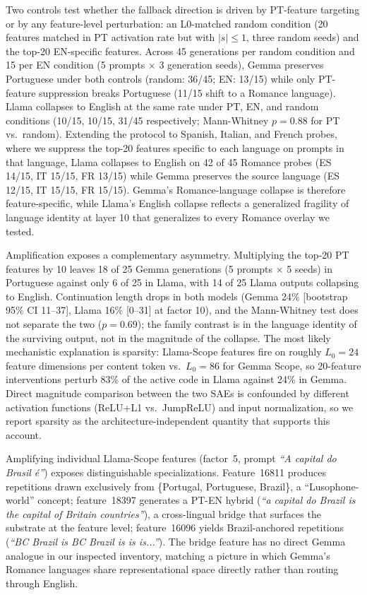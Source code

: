 \documentclass[runningheads]{llncs}
\begin{document}
Two controls test whether the fallback direction is driven by PT-feature targeting or by any feature-level perturbation: an L0-matched random condition (20 features matched in PT activation rate but with $|s| \le 1$, three random seeds) and the top-20 EN-specific features. Across 45 generations per random condition and 15 per EN condition (5 prompts $\times$ 3 generation seeds), Gemma preserves Portuguese under both controls (random: 36/45; EN: 13/15) while only PT-feature suppression breaks Portuguese (11/15 shift to a Romance language). Llama collapses to English at the same rate under PT, EN, and random conditions (10/15, 10/15, 31/45 respectively; Mann-Whitney $p = 0.88$ for PT vs.\ random). Extending the protocol to Spanish, Italian, and French probes, where we suppress the top-20 features specific to each language on prompts in that language, Llama collapses to English on 42 of 45 Romance probes (ES 14/15, IT 15/15, FR 13/15) while Gemma preserves the source language (ES 12/15, IT 15/15, FR 15/15). Gemma's Romance-language collapse is therefore feature-specific, while Llama's English collapse reflects a generalized fragility of language identity at layer 10 that generalizes to every Romance overlay we tested.

Amplification exposes a complementary asymmetry. Multiplying the top-20 PT features by 10 leaves 18 of 25 Gemma generations (5 prompts $\times$ 5 seeds) in Portuguese against only 6 of 25 in Llama, with 14 of 25 Llama outputs collapsing to English. Continuation length drops in both models (Gemma 24\% [bootstrap 95\% CI 11--37], Llama 16\% [0--31] at factor 10), and the Mann-Whitney test does not separate the two ($p = 0.69$); the family contrast is in the language identity of the surviving output, not in the magnitude of the collapse. The most likely mechanistic explanation is sparsity: Llama-Scope features fire on roughly $L_0 = 24$ feature dimensions per content token vs.\ $L_0 = 86$ for Gemma Scope, so 20-feature interventions perturb 83\% of the active code in Llama against 24\% in Gemma. Direct magnitude comparison between the two SAEs is confounded by different activation functions (ReLU+L1 vs.\ JumpReLU) and input normalization, so we report sparsity as the architecture-independent quantity that supports this account.

Amplifying individual Llama-Scope features (factor~5, prompt \emph{``A capital do Brasil \'e''}) exposes distinguishable specializations. Feature~16811 produces repetitions drawn exclusively from \{Portugal, Portuguese, Brazil\}, a ``Lusophone-world'' concept; feature~18397 generates a PT-EN hybrid (\emph{``a capital do Brazil is the capital of Britain countries''}), a cross-lingual bridge that surfaces the substrate at the feature level; feature~16096 yields Brazil-anchored repetitions (\emph{``BC Brazil is BC Brazil is is is...''}). The bridge feature has no direct Gemma analogue in our inspected inventory, matching a picture in which Gemma's Romance languages share representational space directly rather than routing through English.
\end{document}
